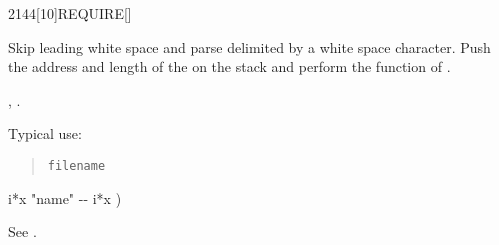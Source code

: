 \begin{worddef}{2144}[10]{REQUIRE}[]%
\item {}

	Skip leading white space and parse  delimited by a
	white space character. Push the address and length of the
	 on the stack and perform the function of
	.

\see {},
	.

	\begin{rationale} %
		Typical use:
		\begin{quote}
			 \texttt{filename}
		\end{quote}
	\end{rationale}

	\begin{implement} %
		\word{:}   i*x "name" -{}- i*x ) \\
		\tab {}  \word{;}
	\end{implement}

	\begin{testing} %
		See .
	\end{testing}
\end{worddef}

